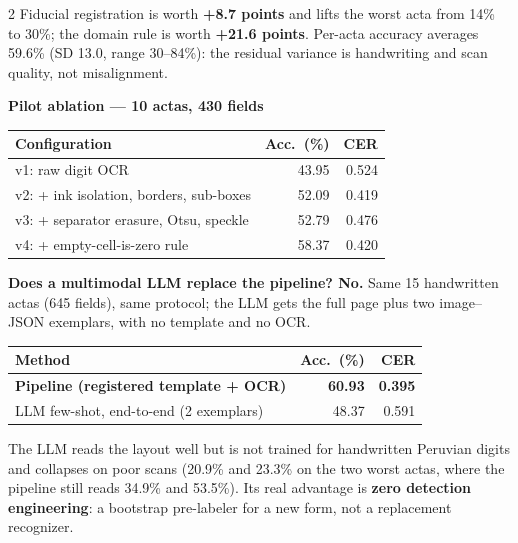 \documentclass{article}
\newcommand{\chico}{\fontsize{23}{29}\selectfont}
\begin{document}
\begin{multicols}{2}
\vspace{4mm}
Fiducial registration is worth \textbf{+8.7 points} and lifts the worst acta
from 14\% to 30\%; the domain rule is worth \textbf{+21.6 points}. Per-acta
accuracy averages 59.6\% (SD 13.0, range 30--84\%): the residual variance is
handwriting and scan quality, not misalignment.

\vspace{5mm}
\textbf{Pilot ablation --- 10 actas, 430 fields}
\vspace{2mm}

{\chico
\begin{tabular}{@{}p{}rr@{}}
\toprule
\textbf{Configuration} & \textbf{Acc.\ (\%)} & \textbf{CER} \\
\midrule
v1: raw digit OCR                        & 43.95 & 0.524 \\
v2: + ink isolation, borders, sub-boxes  & 52.09 & 0.419 \\
v3: + separator erasure, Otsu, speckle   & 52.79 & 0.476 \\
v4: + empty-cell-is-zero rule            & 58.37 & 0.420 \\
\bottomrule
\end{tabular}}

\vspace{5mm}
\textbf{Does a multimodal LLM replace the pipeline? No.} Same 15 handwritten
actas (645 fields), same protocol; the LLM gets the full page plus two
image--JSON exemplars, with no template and no OCR.
\vspace{2mm}

{\chico
\begin{tabular}{@{}p{}rr@{}}
\toprule
\textbf{Method} & \textbf{Acc.\ (\%)} & \textbf{CER} \\
\midrule
\textbf{Pipeline (registered template + OCR)} & \textbf{60.93} & \textbf{0.395} \\
LLM few-shot, end-to-end (2 exemplars)        & 48.37 & 0.591 \\
\bottomrule
\end{tabular}}

\vspace{4mm}
The LLM reads the layout well but is not trained for handwritten Peruvian
digits and collapses on poor scans (20.9\% and 23.3\% on the two worst actas,
where the pipeline still reads 34.9\% and 53.5\%). Its real advantage is
\textbf{zero detection engineering}: a bootstrap pre-labeler for a new form,
not a replacement recognizer.


\end{multicols}
\end{document}
